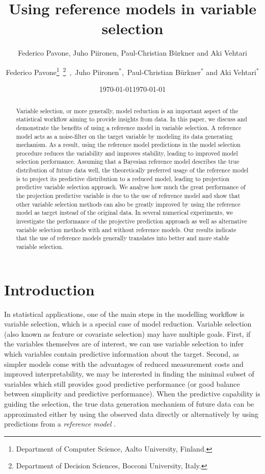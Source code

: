 \documentclass[a4]{article}
\title{Using reference models in variable selection 
	\vspace{.1in}}
\author{Federico Pavone, Juho Piironen, Paul-Christian B\"{u}rkner and Aki Vehtari}
\author{
      Federico Pavone\footnote{Department of Computer Science, Aalto University, Finland.}\, \footnote{Department of Decision Sciences, Bocconi University, Italy.}%
      \,,\,
  Juho Piironen$^*$,\,
  Paul-Christian B\"{u}rkner$^*$
  and Aki Vehtari$^*$
  }
\date{\today}
\date{\today}
\theoremstyle{definition}
\begin{document}
\maketitle
\begin{abstract}
  Variable selection, or more generally, model reduction is an important aspect of the statistical workflow aiming to provide insights from data. In this paper, we discuss and demonstrate the benefits of using a reference model in variable selection. A reference model acts as a noise-filter on the target variable by modeling its data generating mechanism. As a result, using the reference model predictions in the model selection procedure reduces the variability and improves stability, leading to improved model selection performance. Assuming that a Bayesian reference model describes the true distribution of future data well, the theoretically preferred usage of the reference model is to project its predictive distribution to a reduced model, leading to projection predictive variable selection approach. We analyse how much the great performance of the projection predictive variable is due to the use of reference model and show that other variable selection methods can also be greatly improved by using the reference model as target instead of the original data. In several numerical experiments, we investigate the performance of the projective prediction approach as well as alternative variable selection methods with and without reference models. Our results indicate that the use of reference models generally translates into better and more stable variable selection.
\end{abstract}

\hypertarget{introduction}{%
\section{Introduction}\label{introduction}}

In statistical applications, one of the main steps in the modelling
workflow is variable selection, which is a special case of
model reduction. Variable selection (also known as feature or 
covariate selection) may have multiple goals.  First,
if the variables themselves are of interest, we can use variable
selection to infer which variables contain predictive information
about the target. Second, as simpler models come with the
advantages of reduced measurement costs and improved interpretability,
we may be interested in finding the minimal subset of variables which
still provides good predictive performance (or good balance between
simplicity and predictive performance).  When the predictive
capability is guiding the selection, the true data generation
mechanism of future data can be approximated either by using the
observed data directly or alternatively by using predictions from a
\emph{reference model} \citep{vehtari2012survey}.
\end{document}

